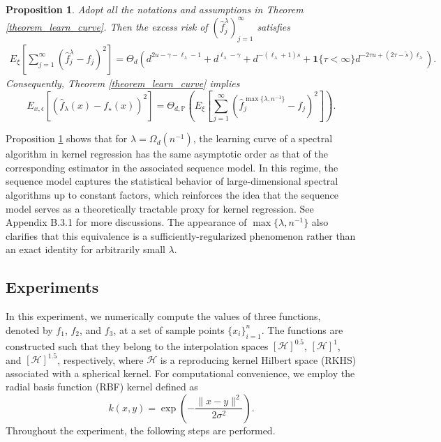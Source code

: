 \documentclass{article}
\theoremstyle{plain}
\newtheorem{proposition}[theorem]{Proposition}
\theoremstyle{definition}
\theoremstyle{remark}
\begin{document}
\begin{proposition}\label{prop_learning_curve_of_sequence}
    Adopt all the notations and assumptions in Theorem \ref{theorem_learn_curve}. 
    Then the excess risk of $(\hat{f}_j^{\lambda})_{j=1}^{\infty}$ satisfies
\begin{equation}\label{eqn_prop_learning_curve_of_sequence_0}
\begin{aligned}
     E_{\xi}\left[\sum_{j=1}^{\infty}(\hat{f}_j^{\lambda} - f_j)^2\right]
= 
\Theta_{d} \left( 
d^{2u - \gamma - \ell_{\lambda} - 1}
+ d^{\ell_{\lambda} - \gamma}
+ d^{-(\ell_{\lambda} + 1)  s}
+ \mathbf{1}\{\tau<\infty\} d^{-2  \tau  u + (2  \tau - \tilde{s})  \ell_{\lambda}}
\right).
\end{aligned}
\end{equation}
Consequently, Theorem \ref{theorem_learn_curve} implies
\begin{equation}\label{eqn_prop_learning_curve_of_sequence}
    E_{x, \epsilon} \left[ \left(\hat{f}_{\lambda}(x) - f_{\star}(x) \right)^{2} \right] = \Theta_{d, \mathbb{P}} \left(
E_{\xi}\left[\sum_{j=1}^{\infty}(\hat{f}_j^{\max\{\lambda, n^{-1}\}} - f_j)^2\right]
\right).
\end{equation}
\end{proposition}


Proposition \ref{prop_learning_curve_of_sequence} shows that for $\lambda=\Omega_d(n^{-1})$, the learning curve of a spectral algorithm in kernel regression has the same asymptotic order as that of the corresponding estimator in the associated sequence model.
In this regime, the sequence model captures the statistical behavior of large-dimensional spectral algorithms up to constant factors, which reinforces the idea that the sequence model serves as a theoretically tractable proxy for kernel regression. See Appendix B.3.1 for more discussions. 
The appearance of $\max\{\lambda,n^{-1}\}$ also clarifies that this equivalence is a sufficiently-regularized phenomenon rather than an exact identity for arbitrarily small $\lambda$.



\iffalse
\subsection{Experiments}



In this experiment, we numerically compute the values of three functions, denoted by $f_1$, $f_2$, and $f_3$, at a set of sample points $\{x_i\}_{i=1}^{n}$. The functions are constructed such that they belong to the interpolation spaces $[\mathcal{H}]^{0.5}$, $[\mathcal{H}]^{1}$, and $[\mathcal{H}]^{1.5}$, respectively, where $\mathcal{H}$ is a reproducing kernel Hilbert space (RKHS) associated with a spherical kernel. For computational convenience, we employ the radial basis function (RBF) kernel defined as
\[
k(x,y)=\exp\left(-\frac{\|x-y\|^2}{2\sigma^2}\right).
\]
Throughout the experiment, the following steps are performed.
\end{document}
